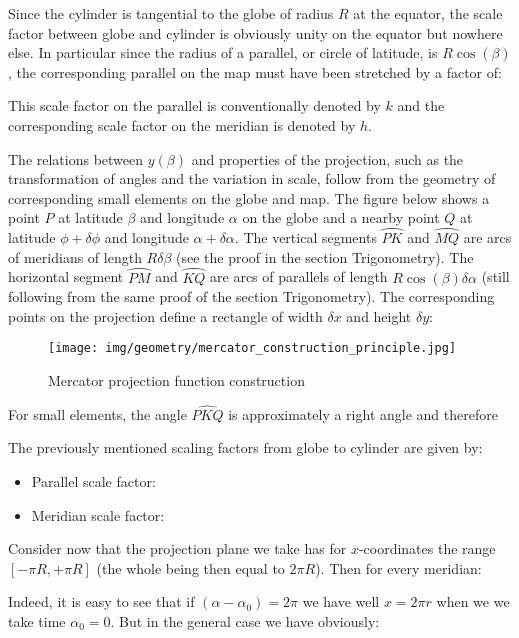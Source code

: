 	Since the cylinder is tangential to the globe of radius $R$ at the equator, the scale factor between globe and cylinder is obviously unity on the equator but nowhere else. In particular since the radius of a parallel, or circle of latitude, is $R\cos(\beta)$, the corresponding parallel on the map must have been stretched by a factor of:
	
	This scale factor on the parallel is conventionally denoted by $k$ and the corresponding scale factor on the meridian is denoted by $h$.
	
	The relations between $y(\beta)$ and properties of the projection, such as the transformation of angles and the variation in scale, follow from the geometry of corresponding small elements on the globe and map. The figure below shows a point $P$ at latitude $\beta$ and longitude $\alpha$ on the globe and a nearby point $Q$ at latitude $\phi + \delta \phi$ and longitude $\alpha + \delta \alpha$. The vertical segments $\wideparen{PK}$ and $\wideparen{MQ}$ are arcs of meridians of length $R\delta \beta$ (see the proof in the section Trigonometry). The horizontal segment $\wideparen{PM}$ and $\wideparen{KQ}$ are arcs of parallels of length $R\cos(\beta)\delta\alpha$ (still following from the same proof of the section Trigonometry). The corresponding points on the projection define a rectangle of width $\delta x$ and height $\delta y$:
	\begin{figure}[H]
		\centering
		\texttt{[image: img/geometry/mercator\_construction\_principle.jpg]}
		\caption{Mercator projection function construction}
	\end{figure}
	For small elements, the angle $\widehat{PKQ}$ is approximately a right angle and therefore
	
	The previously mentioned scaling factors from globe to cylinder are given by:
	\begin{itemize}
		\item Parallel scale factor: 
		 

		\item Meridian scale factor:
		 
	\end{itemize}
	Consider now that the projection plane we take has for $x$-coordinates the range $[-\pi R,+\pi R]$ (the whole being then equal to $2\pi R$). Then for every meridian:
	 
	Indeed, it is easy to see that if $(\alpha-\alpha_0)=2\pi$ we have well $x=2\pi r$ when we we take time $\alpha_0=0$. But in the general case we have obviously:
	 
